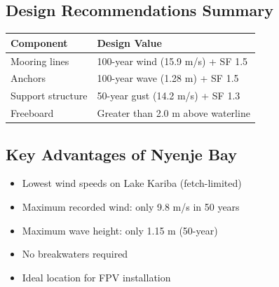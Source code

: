 \documentclass[12pt]{article}
\begin{document}
\subsection{Design Recommendations Summary}

\begin{center}
\begin{tabular}{|l|l|}
\hline
\textbf{Component} & \textbf{Design Value} \\
\hline
Mooring lines & 100-year wind (15.9 m/s) + SF 1.5 \\
Anchors & 100-year wave (1.28 m) + SF 1.5 \\
Support structure & 50-year gust (14.2 m/s) + SF 1.3 \\
Freeboard & Greater than 2.0 m above waterline \\
\hline
\end{tabular}
\end{center}

\subsection{Key Advantages of Nyenje Bay}

\begin{itemize}
    \item Lowest wind speeds on Lake Kariba (fetch-limited)
    \item Maximum recorded wind: only 9.8 m/s in 50 years
    \item Maximum wave height: only 1.15 m (50-year)
    \item No breakwaters required
    \item Ideal location for FPV installation
\end{itemize}
\end{document}
